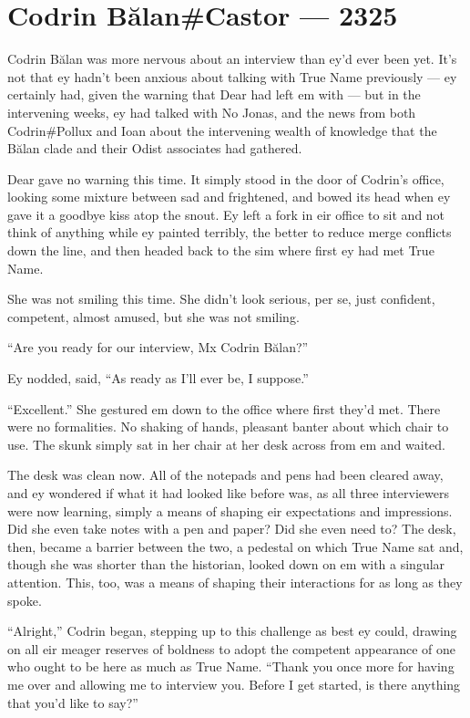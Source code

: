 \hypertarget{codrin-bux103lancastor-2325}{%
\chapter{Codrin Bălan\#Castor — 2325}\label{codrin-bux103lancastor-2325}}

Codrin Bălan was more nervous about an interview than ey'd ever been yet. It's not that ey hadn't been anxious about talking with True Name previously — ey certainly had, given the warning that Dear had left em with — but in the intervening weeks, ey had talked with No Jonas, and the news from both Codrin\#Pollux and Ioan about the intervening wealth of knowledge that the Bălan clade and their Odist associates had gathered.

Dear gave no warning this time. It simply stood in the door of Codrin's office, looking some mixture between sad and frightened, and bowed its head when ey gave it a goodbye kiss atop the snout. Ey left a fork in eir office to sit and not think of anything while ey painted terribly, the better to reduce merge conflicts down the line, and then headed back to the sim where first ey had met True Name.

She was not smiling this time. She didn't look serious, per se, just confident, competent, almost amused, but she was not smiling.

``Are you ready for our interview, Mx Codrin Bălan?''

Ey nodded, said, ``As ready as I'll ever be, I suppose.''

``Excellent.'' She gestured em down to the office where first they'd met. There were no formalities. No shaking of hands, pleasant banter about which chair to use. The skunk simply sat in her chair at her desk across from em and waited.

The desk was clean now. All of the notepads and pens had been cleared away, and ey wondered if what it had looked like before was, as all three interviewers were now learning, simply a means of shaping eir expectations and impressions. Did she even take notes with a pen and paper? Did she even need to? The desk, then, became a barrier between the two, a pedestal on which True Name sat and, though she was shorter than the historian, looked down on em with a singular attention. This, too, was a means of shaping their interactions for as long as they spoke.

``Alright,'' Codrin began, stepping up to this challenge as best ey could, drawing on all eir meager reserves of boldness to adopt the competent appearance of one who ought to be here as much as True Name. ``Thank you once more for having me over and allowing me to interview you. Before I get started, is there anything that you'd like to say?''

